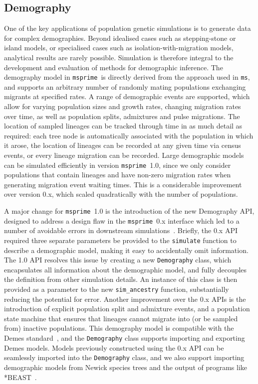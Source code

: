 \documentclass{article}
\newcommand{\msprime}[0]{\texttt{msprime}}
\newcommand{\ms}[0]{\texttt{ms}}
\begin{document}
\subsection*{Demography}
\label{sec-demography}
One of the key applications of population genetic simulations is to generate
data for complex demographies. Beyond idealised cases such as stepping-stone or
island models, or specialised cases such as isolation-with-migration models,
analytical results are rarely possible. Simulation is therefore integral to the
development and evaluation of methods for demographic inference. The demography
model in \msprime\ is directly derived from the approach used in \ms, and
supports an arbitrary number of randomly mating populations exchanging migrants
at specified rates. A range of demographic events are supported, which allow for
varying population sizes and growth rates, changing migration rates over time,
as well as population splits, admixtures and pulse migrations.
The location of sampled lineages
can be tracked through time in as much detail as required: each tree node is
automatically associated with the population in which it arose, the location of
lineages can be recorded at any given time via census events, or every lineage
migration can be recorded.
Large demographic models can be simulated efficiently in version \msprime\ 1.0,
since we only consider populations that contain lineages and
have non-zero migration rates when generating migration event
waiting times. This is a considerable improvement
over version 0.x, which scaled quadratically with the number of populations.

A major change for \msprime\ 1.0 is the introduction of the new Demography API,
designed to address a design flaw in the \msprime\ 0.x interface which led to
a number of avoidable errors in downstream
simulations~\citep{ragsdale2020lessons}. Briefly, the 0.x API required three
separate parameters be provided to the \texttt{simulate} function to describe a
demographic model, making it easy to accidentally omit information. The 1.0 API
resolves this issue by creating a new \texttt{Demography} class, which
encapsulates all information about the demographic model, and fully decouples
the definition from other simulation details. An instance of this class is then
provided as a parameter to the new \texttt{sim\_ancestry} function,
substantially reducing the potential for error.
Another improvement over the
0.x APIs is the introduction of explicit population split and admixture events,
and a population state machine that ensures that lineages cannot migrate into
(or be sampled from) inactive populations. This demography model is compatible
with the Demes standard~\citep{gower2021demes}, and the \texttt{Demography}
class supports importing and exporting Demes models.
Models previously constructed using the 0.x API can be seamlessly imported into
the \texttt{Demography} class, and we also support importing demographic
models from Newick species trees and the output of programs
like *BEAST~\citep{heled2009bayesian}.
\end{document}

